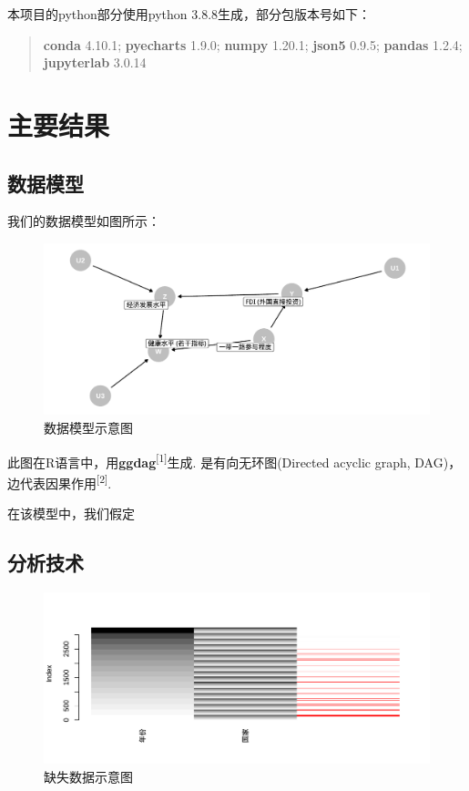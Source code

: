 \documentclass[]{ctexart}
\begin{document}
本项目的python部分使用python 3.8.8生成，部分包版本号如下：

\begin{quote}
\textbf{conda} 4.10.1; \textbf{pyecharts} 1.9.0; \textbf{numpy} 1.20.1;
\textbf{json5} 0.9.5; \textbf{pandas} 1.2.4; \textbf{jupyterlab} 3.0.14
\end{quote}

\hypertarget{ux4e3bux8981ux7ed3ux679c}{%
\section{主要结果}\label{ux4e3bux8981ux7ed3ux679c}}

\hypertarget{ux6570ux636eux6a21ux578b}{%
\subsection{数据模型}\label{ux6570ux636eux6a21ux578b}}

我们的数据模型如图所示：

\begin{figure}

{\centering \includegraphics[width=0.65\linewidth,height=0.6\textheight]{resources/DAG} 

}

\caption{数据模型示意图}\label{fig:unnamed-chunk-3}
\end{figure}

此图在R语言中，用\textbf{ggdag}\textsuperscript{{[}1{]}}生成.
是有向无环图(Directed acyclic graph,
DAG)，边代表因果作用\textsuperscript{{[}2{]}}.

在该模型中，我们假定

\hypertarget{ux5206ux6790ux6280ux672f}{%
\subsection{分析技术}\label{ux5206ux6790ux6280ux672f}}

\begin{figure}

{\centering \includegraphics[width=0.65\linewidth,height=0.6\textheight]{resources/Missing data} 

}

\caption{缺失数据示意图}\label{fig:unnamed-chunk-4}
\end{figure}
\end{document}
